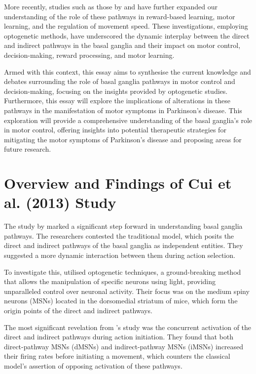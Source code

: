 \documentclass[10pt]{article}
\begin{document}
\begin{sloppypar}
  More recently, studies such as those by \cite{hilt_evidence_2016} and \cite{wang_direct_2015} have further expanded our understanding of the role of these pathways in reward-based learning, motor learning, and the regulation of movement speed. These investigations, employing optogenetic methods, have underscored the dynamic interplay between the direct and indirect pathways in the basal ganglia and their impact on motor control, decision-making, reward processing, and motor learning.

  Armed with this context, this essay aims to synthesise the current knowledge and debates surrounding the role of basal ganglia pathways in motor control and decision-making, focusing on the insights provided by optogenetic studies. Furthermore, this essay will explore the implications of alterations in these pathways in the manifestation of motor symptoms in Parkinson’s disease. This exploration will provide a comprehensive understanding of the basal ganglia’s role in motor control, offering insights into potential therapeutic strategies for mitigating the motor symptoms of Parkinson’s disease and proposing areas for future research.

  \section{Overview and Findings of Cui et al. (2013) Study}
  \label{sec:cui-et-al-2013}

  The study by \cite{cui_concurrent_2013} marked a significant step forward in understanding basal ganglia pathways. The researchers contested the traditional model, which posits the direct and indirect pathways of the basal ganglia as independent entities. They suggested a more dynamic interaction between them during action selection.

  To investigate this, \citeauthor{cui_concurrent_2013} utilised optogenetic techniques, a ground-breaking method that allows the manipulation of specific neurons using light, providing unparalleled control over neuronal activity. Their focus was on the medium spiny neurons (MSNs) located in the dorsomedial striatum of mice, which form the origin points of the direct and indirect pathways.

  The most significant revelation from \citeauthor{cui_concurrent_2013} ’s study was the concurrent activation of the direct and indirect pathways during action initiation. They found that both direct-pathway MSNs (dMSNs) and indirect-pathway MSNs (iMSNs) increased their firing rates before initiating a movement, which counters the classical model’s assertion of opposing activation of these pathways.


\end{sloppypar}
\end{document}
